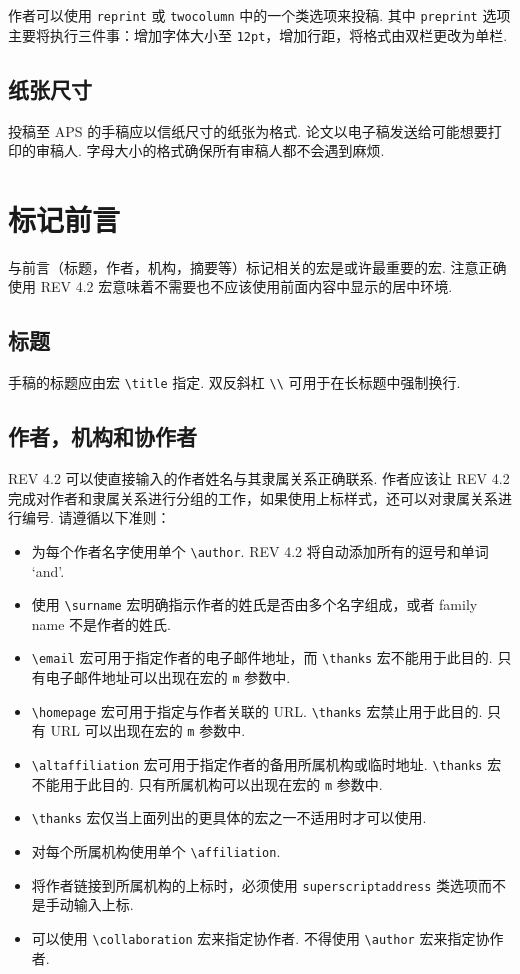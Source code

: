 \documentclass[twocolumn, amssymb, bibnotes, aps, prd, 10pt]{revtex4-2}
\newcommand{\revtex}{REV\hologo{TeX}}
\newcommand{\classoption}[1]{\texttt{#1}}
\newcommand{\macro}[1]{\texttt{\textbackslash#1}}
\newcommand{\m}[1]{\macro{#1}}
\begin{document}
作者可以使用 \classoption{reprint} 或 \classoption{twocolumn} 中的一个类选项来投稿.
其中 \classoption{preprint} 选项主要将执行三件事：增加字体大小至 \classoption{12pt}，增加行距，将格式由双栏更改为单栏.

\subsection{纸张尺寸}
投稿至 APS 的手稿应以信纸尺寸的纸张为格式. 论文以电子稿发送给可能想要打印的审稿人. 字母大小的格式确保所有审稿人都不会遇到麻烦.

\section{标记前言}
与前言（标题，作者，机构，摘要等）标记相关的宏是或许最重要的宏. 注意正确使用 {\revtex} 4.2 宏意味着不需要也不应该使用前面内容中显示的居中环境.

\subsection{标题}
手稿的标题应由宏 \m{title} 指定. 双反斜杠 \verb|\\| 可用于在长标题中强制换行.

\subsection{作者，机构和协作者}
\label{sec:authors}
{\revtex} 4.2 可以使直接输入的作者姓名与其隶属关系正确联系. 作者应该让 {\revtex} 4.2 完成对作者和隶属关系进行分组的工作，如果使用上标样式，还可以对隶属关系进行编号. 请遵循以下准则：
\begin{itemize}
\item 为每个作者名字使用单个 \m{author}. {\revtex} 4.2 将自动添加所有的逗号和单词 `and'.
\item 使用 \m{surname} 宏明确指示作者的姓氏是否由多个名字组成，或者 family name 不是作者的姓氏.
\item \m{email} 宏可用于指定作者的电子邮件地址，而 \m{thanks} 宏不能用于此目的. 只有电子邮件地址可以出现在宏的 \classoption{m} 参数中.
\item \m{homepage} 宏可用于指定与作者关联的 URL. \m{thanks} 宏禁止用于此目的. 只有 URL 可以出现在宏的 \classoption{m} 参数中.
\item \m{altaffiliation} 宏可用于指定作者的备用所属机构或临时地址. \m{thanks} 宏不能用于此目的. 只有所属机构可以出现在宏的 \classoption{m} 参数中.
\item \m{thanks} 宏仅当上面列出的更具体的宏之一不适用时才可以使用.
\item 对每个所属机构使用单个 \m{affiliation}.
\item 将作者链接到所属机构的上标时，必须使用 \classoption{superscriptaddress} 类选项而不是手动输入上标.
\item 可以使用 \m{collaboration} 宏来指定协作者. 不得使用 \m{author} 宏来指定协作者.
\end{itemize}
\end{document}
